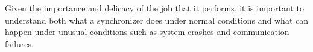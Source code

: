 \documentclass{article}
\begin{document}

Given the importance and delicacy of the job that it performs, it is
important to understand both what a synchronizer does under normal
conditions and what can happen under unusual conditions such as system
crashes and communication failures.  




\end{document}
